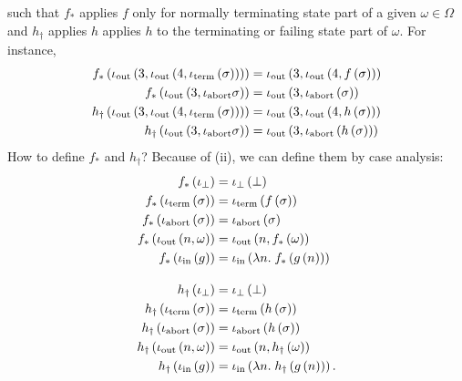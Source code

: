 \begin{enumcirc}
\begin{enumrm}
		such that $f_*$ applies $f$ only for normally terminating state part of a given
		$\omega \in \Omega$ and $h_\dagger$ applies $h$ applies $h$ to the terminating
		or failing state part of $\omega$.
		For instance,
		\begin{align*}
			f_*\left( \iota_{\textrm{out}}\left( 3, \iota_{\textrm{out}}\left( 4, \iota_{\textrm{term}}\left( \sigma \right) \right) \right) \right)       & = \iota_{\textrm{out}}\left( 3, \iota_{\textrm{out}}\left( 4, f\left( \sigma \right) \right) \right) \\
			f_*\left( \iota_{\textrm{out}}\left( 3, \iota_{\textrm{abort}}{\sigma} \right) \right)                            & = \iota_{\textrm{out}}\left( 3, \iota_{\textrm{abort}}\left( \sigma \right) \right)           \\
			h_\dagger\left( \iota_{\textrm{out}}\left( 3, \iota_{\textrm{out}}\left( 4, \iota_{\textrm{term}}\left( \sigma \right) \right) \right) \right) & = \iota_{\textrm{out}}\left( 3, \iota_{\textrm{out}}\left( 4, h\left( \sigma \right) \right) \right) \\
			h_\dagger\left( \iota_{\textrm{out}}\left( 3, \iota_{\textrm{abort}}{\sigma} \right) \right)                      & = \iota_{\textrm{out}}\left( 3, \iota_{\textrm{abort}}\left( h\left( \sigma \right) \right) \right)
		\end{align*}
		How to define $f_*$ and $h_\dagger$?
		Because of (ii), we can define them by case analysis:
		\begin{align*}
			f_*\left( \iota_\bot \right)                         =\; & \iota_\bot\left( \bot \right)                                     \\
			f_*\left( \iota_{\textrm{term}}\left( \sigma \right) \right)          =\; & \iota_{\textrm{term}}\left( f\left( \sigma \right) \right)                         \\
			f_*\left( \iota_{\textrm{abort}}\left( \sigma \right) \right)         =\; & \iota_{\textrm{abort}}\left( \sigma \right)                                 \\
			f_*\left( \iota_{\textrm{out}}\left( n, \omega \right) \right)        =\; & \iota_{\textrm{out}}\left( n, f_*\left( \omega \right) \right)                     \\
			f_*\left( \iota_{\textrm{in}}\left( g \right) \right)                 =\; & \iota_{\textrm{in}}\left( \lambda n.\; f_*\left( g\left( n \right) \right) \right)        \\[1em]
			h_\dagger\left( \iota_\bot \right)                   =\; & \iota_\bot\left( \bot \right)                                     \\
			h_\dagger\left( \iota_{\textrm{term}}\left( \sigma \right) \right)    =\; & \iota_{\textrm{term}}\left( h\left( \sigma \right) \right)                         \\
			h_\dagger\left( \iota_{\textrm{abort}}\left( \sigma \right) \right)   =\; & \iota_{\textrm{abort}}\left( h\left( \sigma \right) \right)                        \\
			h_\dagger\left( \iota_{\textrm{out}}\left( n, \omega \right) \right)  =\; & \iota_{\textrm{out}}\left( n, h_\dagger\left( \omega \right) \right)               \\
			h_\dagger\left( \iota_{\textrm{in}}\left( g \right) \right)           =\; & \iota_{\textrm{in}}\left( \lambda n.\; h_\dagger\left( g\left( n \right) \right) \right).
		\end{align*}

\end{enumrm}
\end{enumcirc}
